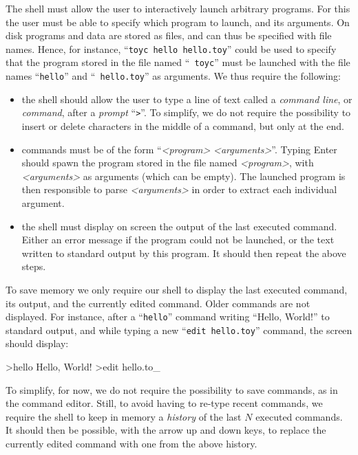 The shell must allow the user to interactively launch arbitrary programs. For
this the user must be able to specify which program to launch, and its
arguments. On disk programs and data are stored as files, and can thus be
specified with file names. Hence, for instance, ``{\tt toyc hello hello.toy}''
could be used to specify that the program stored in the file named ``{\tt
toyc}'' must be launched with the file names ``{\tt hello}'' and ``{\tt
hello.toy}'' as arguments. We thus require the following:
\begin{itemize}
  \item the shell should allow the user to type a line of text called a {\em
  command line}, or {\em command}, after a {\em prompt} ``{\tt >}''. To
  simplify, we do not require the possibility to insert or delete characters in
  the middle of a command, but only at the end.

  \item commands must be of the form ``{\em <program>} {\em <arguments>}''.
  Typing Enter should spawn the program stored in the file named {\em
  <program>}, with {\em <arguments>} as arguments (which can be empty). The
  launched program is then responsible to parse {\em <arguments>} in order to
  extract each individual argument.

  \item the shell must display on screen the output of the last executed
  command. Either an error message if the program could not be launched, or the
  text written to standard output by this program. It should then repeat the
  above steps.
\end{itemize}

To save memory we only require our shell to display the last executed command,
its output, and the currently edited command. Older commands are not displayed.
For instance, after a ``{\tt hello}'' command writing ``Hello, World!'' to
standard output, and while typing a new ``{\tt edit hello.toy}'' command, the
screen should display:
\begin{Code}
>hello
Hello, World!
>edit hello.to\_
\end{Code}

To simplify, for now, we do not require the possibility to save commands, as in
the command editor. Still, to avoid having to re-type recent commands, we
require the shell to keep in memory a {\em history} of the last $N$ executed
commands. It should then be possible, with the arrow up and down keys, to
replace the currently edited command with one from the above history.

